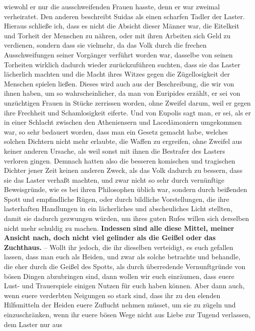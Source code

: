 wiewohl er nur die ausschweifenden Frauen hasste, denn er war zweimal
verheiratet. Den anderen beschreibt Suidas als einen
scharfen Tadler der Laster.
Hieraus schließe ich, dass es nicht die Absicht dieser Männer war, die Eitelkeit
und Torheit der Menschen zu nähren, oder mit ihren Arbeiten sich Geld zu
verdienen, sondern dass sie vielmehr, da das Volk durch die frechen
Ausschweifungen seiner Vorgänger verführt worden war, dasselbe von seinen
Torheiten wirklich dadurch wieder zurückzuführen suchten, dass sie das Laster
lächerlich machten und die Macht ihres Witzes gegen die Zügellosigkeit der
Menschen spielen ließen. Dieses wird auch aus der Beschreibung, die wir von
ihnen haben, um so wahrscheinlicher, da man von
Euripides erzählt, er sei von
unzüchtigen Frauen in Stücke zerrissen worden, ohne Zweifel darum, weil er
gegen ihre Frechheit und Schamlosigkeit eiferte. Und von
Eupolis sagt man, er
sei, als er in einer Schlacht zwischen den
Atheniensern und Lacedämoniern
umgekommen war, so sehr bedauert worden, dass man ein Gesetz gemacht habe,
welches solchen Dichtern nicht mehr erlaubte, die Waffen zu ergreifen, ohne
Zweifel aus keiner anderen Ursache, als weil sonst mit ihnen die Bestrafer des
Lasters verloren gingen. Demnach hatten also die besseren komischen und
tragischen Dichter jener Zeit keinen anderen Zweck, als das Volk dadurch zu
bessern, dass sie das Laster verhaßt machten, und zwar nicht so sehr durch
vernünftige Beweisgründe, wie es bei ihren Philosophen üblich war, sondern durch
beißenden Spott und empfindliche Rügen, oder durch bildliche
Vorstellungen, die
ihre lasterhaften Handlungen in ein lächerliches und abscheuliches Licht
stellten, damit sie dadurch gezwungen würden, um ihres guten Rufes willen
sich derselben nicht mehr schuldig zu machen. \textbf{Indessen sind alle diese
Mittel,
meiner Ansicht nach, doch nicht viel gelinder als die Geißel oder das
Zuchthaus.}
-- Wollt ihr jedoch, die ihr dieselben verteidigt, es euch gefallen lassen, dass
man euch als Heiden, und zwar als solche betrachte und
behandle, die eher durch
die Geißel des Spotts, als durch überredende Vernunftgründe von bösen Dingen
abzubringen sind, dann wollen wir euch einräumen, dass euere Lust- und
Trauerspiele einigen Nutzen für euch haben können. Aber dann auch, wenn euere
verderbten Neigungen so stark sind, dass ihr zu den elenden Hilfsmitteln der
Heiden euere Zuflucht nehmen müsset, um sie zu zügeln und einzuschränken, wenn
ihr euere bösen Wege nicht aus Liebe zur Tugend verlassen, dem Laster nur aus
